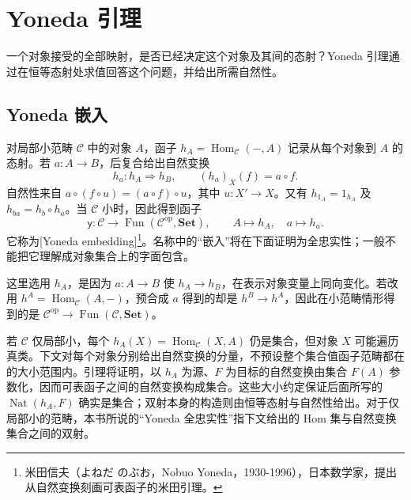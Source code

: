 
\section{Yoneda 引理}
\label{b4:sec:0302}

一个对象接受的全部映射，是否已经决定这个对象及其间的态射？Yoneda 引理通过在恒等态射处求值回答这个问题，并给出所需自然性。


%
%

\subsection{Yoneda 嵌入}
\label{b4:subsec:0302:01}

对局部小范畴 \(\mathcal C\) 中的对象 \(A\)，函子 \(h_A=\operatorname{Hom}_{\mathcal C}(-,A)\) 记录从每个对象到 \(A\) 的态射。若 \(a:A\rightarrow B\)，后复合给出自然变换
\[
	h_a:h_A\Longrightarrow h_B, \qquad (h_a)_X(f)=a\circ f.
\]
自然性来自 \(a\circ(f\circ u)=(a\circ f)\circ u\)，其中 \(u:X'\rightarrow X\)。又有 \(h_{1_A}=1_{h_A}\) 及 \(h_{ba}=h_b\circ h_a\)。当 \(\mathcal C\) 小时，因此得到函子
\[
	\mathsf y:\mathcal C\longrightarrow\operatorname{Fun}(\mathcal C^{\mathrm{op}},\mathbf{Set}), \qquad A\longmapsto h_A,\quad a\longmapsto h_a.
\]
它称为[Yoneda embedding]\footnote{米田信夫（よねだ のぶお，Nobuo Yoneda，1930-1996），日本数学家，提出从自然变换刻画可表函子的米田引理。}。名称中的“嵌入”将在下面证明为全忠实性；一般不能把它理解成对象集合上的字面包含。

\ProseParagraphBreak
这里选用 \(h_A\)，是因为 \(a:A\rightarrow B\) 使 \(h_A\rightarrow h_B\)，在表示对象变量上同向变化。若改用 \(h^A=\operatorname{Hom}_{\mathcal C}(A,-)\)，预合成 \(a\) 得到的却是 \(h^B\rightarrow h^A\)，因此在小范畴情形得到的是 \(\mathcal C^{\mathrm{op}}\rightarrow\operatorname{Fun}(\mathcal C,\mathbf{Set})\)。

\ProseParagraphBreak
若 \(\mathcal C\) 仅局部小，每个 \(h_A(X)=\operatorname{Hom}_{\mathcal C}(X,A)\) 仍是集合，但对象 \(X\) 可能遍历真类。下文对每个对象分别给出自然变换的分量，不预设整个集合值函子范畴都在的大小范围内。引理将证明，以 \(h_A\) 为源、\(F\) 为目标的自然变换由集合 \(F(A)\) 参数化，因而可表函子之间的自然变换构成集合。这些大小约定保证后面所写的 \(\operatorname{Nat}(h_A,F)\) 确实是集合；双射本身的构造则由恒等态射与自然性给出。对于仅局部小的范畴，本书所说的“Yoneda 全忠实性”指下文给出的 Hom 集与自然变换集合之间的双射。

